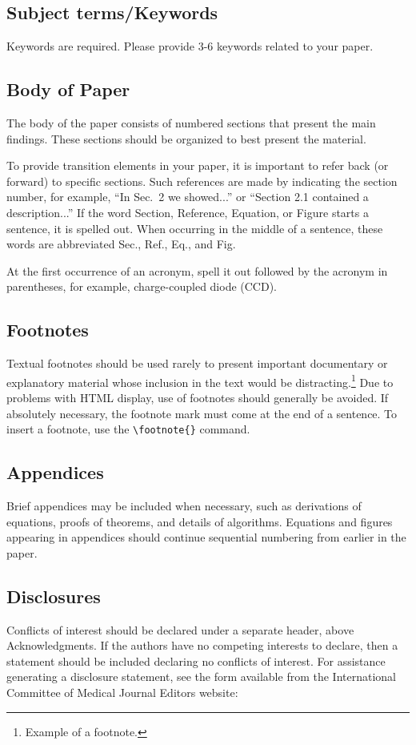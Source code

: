\documentclass[12pt]{spieman}  %
\begin{document}
\begin{spacing}{2}
\subsection{Subject terms/Keywords}
Keywords are required. Please provide 3-6 keywords related to your paper.

\subsection{Body of Paper}
The body of the paper consists of numbered sections that present the main findings. These sections should be organized to best present the material.

To provide transition elements in your paper, it is important to refer back (or forward) to specific sections. Such references are made by indicating the section number, for example, ``In Sec.\ 2 we showed...'' or ``Section 2.1 contained a description...'' If the word Section, Reference, Equation, or Figure starts a sentence, it is spelled out. When occurring in the middle of a sentence, these words are abbreviated Sec., Ref., Eq., and Fig.

At the first occurrence of an acronym, spell it out followed by the acronym in parentheses, for example, charge-coupled diode (CCD).

\subsection{Footnotes}
Textual footnotes should be used rarely to present important documentary or explanatory material whose inclusion in the text would be distracting.\footnote{Example of a footnote.} Due to problems with HTML display, use of footnotes should generally be avoided. If absolutely necessary, the footnote mark must come at the end of a sentence. To insert a footnote, use the {\verb|\footnote{}|} command.

\subsection{Appendices}
Brief appendices may be included when necessary, such as derivations of equations, proofs of theorems, and details of algorithms. Equations and figures appearing in appendices should continue sequential numbering from earlier in the paper.

\subsection{Disclosures}
Conflicts of interest should be declared under a separate header, above Acknowledgments. If the authors have no competing interests to declare, then a statement should be included declaring no conflicts of interest. For assistance generating a disclosure statement, see the form available from  the International Committee of Medical Journal Editors website: 


\end{spacing}
\end{document}

